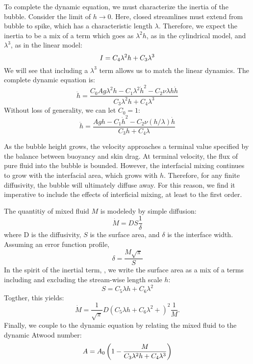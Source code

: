 To complete the dynamic equation, we must characterize the inertia of the bubble.
Consider the limit of $h \rightarrow 0$.  
Here, closed streamlines must extend from bubble to spike, which has a characteristic length $\lambda$.
Therefore, we expect the inertia to be a mix of a term which goes as $\lambda^2 h$, as in the cylindrical model, and $\lambda^3$, as in the linear model:
\begin{equation} \elabel{inertia}
I = C_4 \lambda^2 h + C_3 \lambda^3
\end{equation}
We will see that including a $\lambda^3$ term allows us to match the linear dynamics.
The complete dynamic equation is:
\begin{equation}
\ddot{h} = \frac{C_0 A g \lambda^2 h - C_1 \lambda^2 \dot{h}^2 - C_2 \nu \lambda h \dot{h}}{C_3 \lambda^2 h + C_4 \lambda^3}
\end{equation}
Without loss of generality, we can let $C_0 = 1$:
\begin{equation}
\ddot{h} = \frac{A g h - C_1 \dot{h}^2 - C_2 \nu (h/\lambda) \dot{h}}{ C_3 h + C_4 \lambda }
\end{equation}

As the bubble height grows, the velocity approaches a terminal value specified by the balance between buoyancy and skin drag.
At terminal velocity, the flux of pure fluid into the bubble is bounded.
However, the interfacial mixing continues to grow with the interfacial area, which grows with $h$.
Therefore, for any finite diffusivity, the bubble will ultimately diffuse away.
For this reason, we find it imperative to include the effects of interficial mixing, at least to the first order.

The quantitiy of mixed fluid $M$ is modeledy by simple diffusion:
\begin{equation}
\dot{M} = D S \frac{1}{\delta}
\end{equation}
where D is the diffusivity,
$S$ is the surface area, and 
$\delta$ is the interface width.
Assuming an error function profile, 
\begin{equation}
\delta = \frac{M \sqrt{\pi}}{S}
\end{equation}
In the spirit of the inertial term, , we write the surface area as a mix of a terms including and excluding the stream-wise length scale $h$:
\begin{equation}
S = C_5 \lambda h + C_6 \lambda^2
\end{equation}
Togther, this yields:
\begin{equation}
\dot{M} = \frac{1}{\sqrt{\pi}} D (C_5 \lambda h + C_6 \lambda^2 + )^2 \frac{1}{M}.
\end{equation}
Finally, we couple to the dynamic equation by relating the mixed fluid to the dynamic Atwood number:
\begin{equation} \elabel{effective-atwood}
A = A_0 \left(1 - \frac{M}{C_3 \lambda^2 h  + C_4 \lambda^3} \right)
\end{equation}



